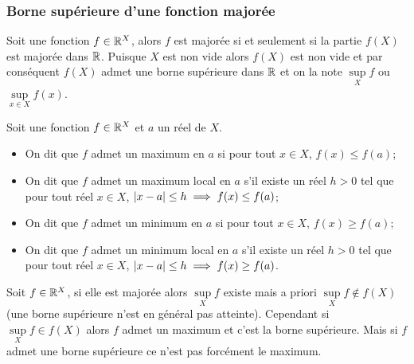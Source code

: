 \subsubsection{Borne supérieure d'une fonction majorée}
Soit une fonction $f \in \mathbb{R}^X$, alors $f$ est majorée si et seulement si la partie $f(X)$ est majorée dans $\mathbb{R}$. Puisque $X$ est non vide alors $f(X)$ est non vide et par conséquent $f(X)$ admet une borne supérieure dans $\mathbb{R}$ et on la note $\sup\limits_{X}f$ ou $\sup\limits_{x \in X}f(x)$.

\begin{defdef}
  Soit une fonction $f \in \mathbb{R}^X$ et $a$ un réel de $X$.
  \begin{itemize}
  \item On dit que $f$ admet un maximum en $a$ si pour tout $x \in X$, $f(x) \leq f(a)$;
  \item On dit que $f$ admet un maximum local en $a$ s'il existe un réel $h >0$ tel que pour tout réel $x \in X$, $\left\lvert x-a\right\rvert \leq h \implies f(x) \leq f(a)$;
  \item On dit que $f$ admet un minimum en $a$ si pour tout $x \in X$, $f(x) \geq f(a)$;
  \item On dit que $f$ admet un minimum local en $a$ s'il existe un réel $h >0$ tel que pour tout réel $x \in X$, $\left\lvert x-a\right\rvert \leq h \implies f(x) \geq f(a)$.
  \end{itemize}
\end{defdef}

Soit $f \in \mathbb{R}^X$, si elle est majorée alors $\sup\limits_{X}f$ existe mais a priori $\sup\limits_{X}f \notin f(X)$ (une borne supérieure n'est en général pas atteinte). Cependant si $\sup\limits_{X}f \in f(X)$ alors $f$ admet un maximum et c'est la borne supérieure. Mais si $f$ admet une borne supérieure ce n'est pas forcément le maximum.

